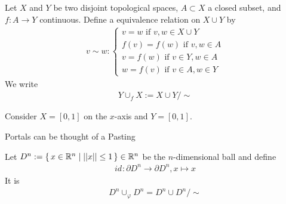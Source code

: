 \begin{defbox}
    \begin{definition}[Pasting]
        Let \(X\) and \(Y\) be two disjoint topological spaces, \(A \subset X\) a closed subset, and \(f: A \longrightarrow Y\) continuous. Define a equivalence relation on \(X \cup Y\) by
        \begin{align*}
            v \sim w :
            \begin{cases}
                v = w \text{ if } v, w \in X \cup Y \\
                f(v) = f(w) \text{ if } v, w \in A \\
                v = f(w) \text{ if } v \in Y, w \in A \\
                w = f(v) \text{ if } v \in A, w \in Y
            \end{cases}
        \end{align*}
        We write
        \begin{align*}
            Y \cup_f X := X \cup Y / \sim
        \end{align*}
    \end{definition}
\end{defbox}
\begin{example}
    Consider \(X = [0, 1]\) on the \(x\)-axis and \(Y = [0, 1]\).
\end{example}
\begin{example}
    Portals can be thought of a Pasting
\end{example}

\begin{example}
    Let \(D^n := \left\{\, x \in \mathbb{R}^n \mid ||x|| \leq 1 \,\right\}\in \mathbb{R}^n\) be the \(n\)-dimensional ball and define
    \begin{align*}
        id_{}: \partial D^n \longrightarrow \partial D^n, x \mapsto x
    \end{align*}
    It is
    \begin{align*}
        D^n \cup_{\varphi} D^n = D^n \cup D^n / \sim
    \end{align*}
\end{example}